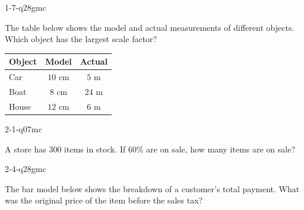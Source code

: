 \documentclass[12pt, fleqn, openany]{studyGuide}
\begin{document}
\begin{practiceQuestion}{1-7-q28}{gmc}
\begin{questionText}
The table below shows the model and actual measurements of different objects. Which object has the largest scale factor?

\begin{center}
\begin{tabular}{|l|c|c|}
\hline
\textbf{Object} & \textbf{Model} & \textbf{Actual} \\
\hline
Car & $10$ cm & $5$ m \\
\hline
Boat & $8$ cm & $24$ m \\
\hline
House & $12$ cm & $6$ m \\
\hline
\end{tabular}
\end{center}
\end{questionText}
\end{practiceQuestion}

\begin{practiceQuestion}{2-1-q07}{mc}
\begin{questionText}
A store has $300$ items in stock. If $60\%$ are on sale, how many items are on sale?
\end{questionText}
\end{practiceQuestion}

\begin{practiceQuestion}{2-4-q28}{gmc}
\begin{questionText}
The bar model below shows the breakdown of a customer's total payment. What was the original price of the item before the sales tax?

\begin{center}
\end{center}
\end{questionText}
\end{practiceQuestion}
\end{document}
